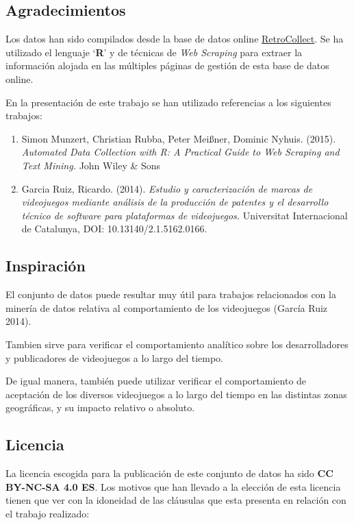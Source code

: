 \documentclass[]{article}
\providecommand{\tightlist}{%
  \setlength{\itemsep}{0pt}\setlength{\parskip}{0pt}}
\begin{document}
\subsection{Agradecimientos}\label{agradecimientos}

Los datos han sido compilados desde la base de datos online
\href{http://www.retrocollect.com/}{RetroCollect}. Se ha utilizado el
lenguaje `\textbf{R}' y de técnicas de \emph{Web Scraping} para extraer
la información alojada en las múltiples páginas de gestión de esta base
de datos online.

En la presentación de este trabajo se han utilizado referencias a los
siguientes trabajos:

\begin{enumerate}
\def\labelenumi{\arabic{enumi}.}
\tightlist
\item
  Simon Munzert, Christian Rubba, Peter Meißner, Dominic Nyhuis. (2015).
  \emph{Automated Data Collection with R: A Practical Guide to Web
  Scraping and Text Mining.} John Wiley \& Sons
\item
  Garcia Ruiz, Ricardo. (2014). \emph{Estudio y caracterización de
  marcas de videojuegos mediante análisis de la producción de patentes y
  el desarrollo técnico de software para plataformas de videojuegos.}
  Universitat Internacional de Catalunya, DOI: 10.13140/2.1.5162.0166.
\end{enumerate}

\subsection{Inspiración}\label{inspiracion}

El conjunto de datos puede resultar muy útil para trabajos relacionados
con la minería de datos relativa al comportamiento de los videojuegos
(García Ruiz 2014).

Tambien sirve para verificar el comportamiento analítico sobre los
desarrolladores y publicadores de videojuegos a lo largo del tiempo.

De igual manera, también puede utilizar verificar el comportamiento de
aceptación de los diversos videojuegos a lo largo del tiempo en las
distintas zonas geográficas, y su impacto relativo o absoluto.

\subsection{Licencia}\label{licencia}

La licencia escogida para la publicación de este conjunto de datos ha
sido \textbf{CC BY-NC-SA 4.0 ES}. Los motivos que han llevado a la
elección de esta licencia tienen que ver con la idoneidad de las
cláusulas que esta presenta en relación con el trabajo realizado:
\end{document}
